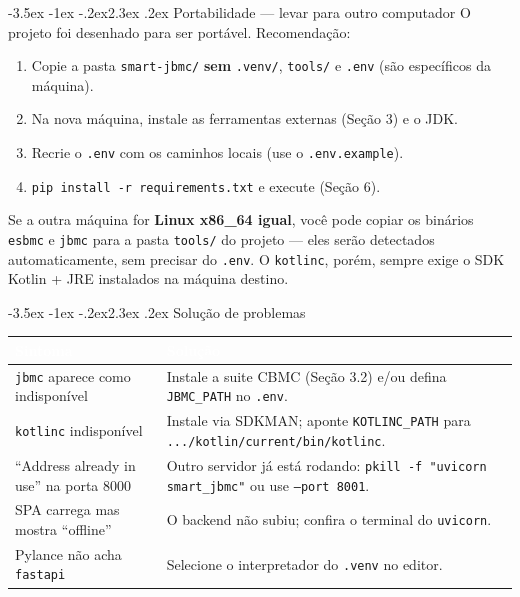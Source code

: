 \documentclass[11pt,a4paper]{article}
\makeatletter
\renewcommand\section{\@startsection{section}{1}{0pt}%
  {-3.5ex \@plus -1ex \@minus -.2ex}{2.3ex \@plus.2ex}%
  {\normalfont\Large\bfseries\color{azulesc}}}
\newcommand{\hc}[1]{\textcolor{white}{\textbf{#1}}}
\newcommand{\nota}[1]{%
  \begin{center}\colorbox{verdebg}{\parbox{0.95\linewidth}{%
  \color{verdebox}#1}}\end{center}}
\makeatother
\begin{document}
\section{Portabilidade --- levar para outro computador}
O projeto foi desenhado para ser port\'avel. Recomenda\c{c}\~ao:
\begin{enumerate}
  \item Copie a pasta \texttt{smart-jbmc/} \textbf{sem} \texttt{.venv/}, \texttt{tools/} e \texttt{.env} (s\~ao espec\'ificos da m\'aquina).
  \item Na nova m\'aquina, instale as ferramentas externas (Se\c{c}\~ao 3) e o JDK.
  \item Recrie o \texttt{.env} com os caminhos locais (use o \texttt{.env.example}).
  \item \texttt{pip install -r requirements.txt} e execute (Se\c{c}\~ao 6).
\end{enumerate}

\nota{Se a outra m\'aquina for \textbf{Linux x86\_64 igual}, voc\^e pode copiar os
bin\'arios \texttt{esbmc} e \texttt{jbmc} para a pasta \texttt{tools/} do projeto --- eles
ser\~ao detectados automaticamente, sem precisar do \texttt{.env}. O \texttt{kotlinc},
por\'em, sempre exige o SDK Kotlin + JRE instalados na m\'aquina destino.}

\section{Solu\c{c}\~ao de problemas}
\begin{center}
\footnotesize
\begin{longtable}{|L{5cm}|L{9cm}|}
\hline
{} \hc{Sintoma} & \hc{Solu\c{c}\~ao} \\ \hline
\endhead
\texttt{jbmc} aparece como indispon\'ivel & Instale a suite CBMC (Se\c{c}\~ao 3.2) e/ou defina \texttt{JBMC\_PATH} no \texttt{.env}. \\ \hline
\texttt{kotlinc} indispon\'ivel & Instale via SDKMAN; aponte \texttt{KOTLINC\_PATH} para \texttt{.../kotlin/current/bin/kotlinc}. \\ \hline
``Address already in use'' na porta 8000 & Outro servidor j\'a est\'a rodando: \texttt{pkill -f "uvicorn smart\_jbmc"} ou use \texttt{--port 8001}. \\ \hline
SPA carrega mas mostra ``offline'' & O backend n\~ao subiu; confira o terminal do \texttt{uvicorn}. \\ \hline
Pylance n\~ao acha \texttt{fastapi} & Selecione o interpretador do \texttt{.venv} no editor. \\ \hline
\end{longtable}
\end{center}
\end{document}
